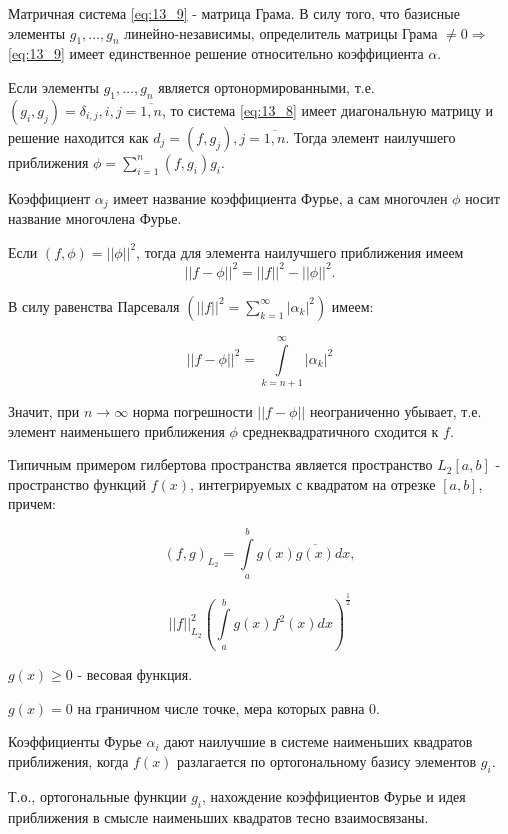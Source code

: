 Матричная система \eqref{eq:13_9} - матрица Грама. В силу того, что базисные элементы $g_1, \ldots, g_n$ линейно-независимы, определитель матрицы Грама $\ne 0 \Rightarrow$ \eqref{eq:13_9} имеет единственное решение относительно коэффициента $\alpha$.

\begin{notes}
  \item Если элементы $g_1, \ldots, g_n$ является ортонормированными, т.е. $(g_i, g_j) = \delta_{i, j}, i, j = \overline{1,n}$, то система \eqref{eq:13_8} имеет диагональную матрицу и решение находится как $d_j = (f, g_j), j = \overline{1, n}$. Тогда элемент наилучшего приближения $\phi = \sum\limits_{i=1}^n (f, g_i)g_i$.

  Коэффициент $\alpha_j$ имеет название коэффициента Фурье, а сам многочлен $\phi$ носит название многочлена Фурье.

  \item Если $(f, \phi) = || \phi ||^2$, тогда для элемента наилучшего приближения имеем
  \begin{equation*}
    ||f - \phi||^2 = ||f||^2 - ||\phi||^2.
  \end{equation*}

  В силу равенства Парсеваля $\left( ||f||^2 = \sum\limits_{k=1}^\infty |\alpha_k|^2 \right)$ имеем:

  \begin{equation*}
    ||f - \phi||^2 = \int\limits_{k = n + 1}^{
    \infty
    } |\alpha_k|^2
  \end{equation*}

  Значит, при $n \to \infty$ норма погрешности $|| f - \phi||$ неограниченно убывает, т.е. элемент наименьшего приближения $\phi$ среднеквадратичного сходится к $f$.

  \item Типичным примером гилбертова пространства является пространство $L_2 [a, b]$ - пространство функций $f(x)$, интегрируемых с квадратом на отрезке $[a, b]$, причем:

  \begin{equation*}
  (f, g)_{L_2} = \int\limits_a^b g(x) \overline{g(x)} dx,
  \end{equation*}

  \begin{equation*}
    \left| \left| f \right| \right|_{L_2}^2 \left( \int\limits_a^b g(x) f^2(x) dx \right)^{\frac{1}{2}}
  \end{equation*}

  $g(x) \geqslant 0$ - весовая функция.

  $g(x) = 0$ на граничном числе точке, мера которых равна 0.

  \item Коэффициенты Фурье $\alpha_i$ дают наилучшие в системе наименьших квадратов приближения, когда $f(x)$ разлагается по ортогональному базису элементов $g_i$.

  Т.о., ортогональные функции $g_i$, нахождение коэффициентов Фурье и идея приближения в смысле наименьших квадратов тесно взаимосвязаны.
\end{notes}
